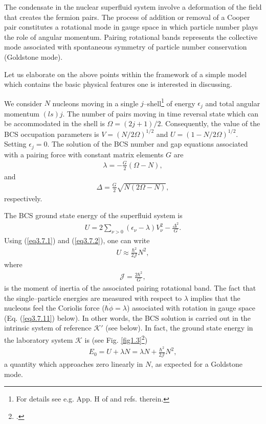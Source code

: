 The condensate in the nuclear superfluid system involve a deformation of the field that creates the fermion pairs. The process of addition or removal of a Cooper pair constitutes a rotational mode in gauge space in which particle number plays the role of angular momentum. Pairing rotational bands represents the collective mode associated with spontaneous symmetry of particle number conservation (Goldstone mode).


Let us elaborate on the above points within the framework of a simple model which contains the basic physical features one is interested in discussing.


We consider $N$ nucleons moving in a single $j$--shell\footnote{For details see e.g. App. H of \cite{Brink:05} and refs. therein.} of energy $\epsilon_j$ and total angular momentum $(ls)j$. The number of pairs moving in time reversal state which can be accommodated in the shell is $\Omega=(2j+1)/2$. Consequently, the value of the BCS occupation parameters is $V=(N/2\Omega)^{1/2}$ and $U=(1-N/2\Omega)^{1/2}$. Setting $\epsilon_j=0$. The solution of the BCS number and gap equations associated with a pairing force with constant matrix elements $G$ are
  \begin{align}\label{eq3.7.1}
  \lambda=-\frac{G}{2}(\Omega-N),
  \end{align}
  and
  \begin{align}\label{eq3.7.2}
\Delta=\frac{G}{2}\sqrt{N(2\Omega-N)},
  \end{align}
respectively.


The BCS ground state energy of the superfluid system is
  \begin{align}\label{eq3.7.3}
U=2\sum_{\nu>0}(\epsilon_\nu-\lambda)V^2_\nu-\frac{\Delta^2}{G}.
  \end{align}
Using (\ref{eq3.7.1}) and (\ref{eq3.7.2}), one can write
  \begin{align}\label{eq3.7.4}
U\approx\frac{\hbar^2}{2\mathcal J}N^2,  
    \end{align}
where
  \begin{align}\label{eq3.7.5}
\mathcal J=\frac{2\hbar^2}{G},  
    \end{align}
is the moment of inertia of the associated pairing rotational band. The fact that the single--particle energies are measured with respect to $\lambda$ implies that the nucleons feel the Coriolis force ($\hbar\dot{\phi}=\lambda$) associated with rotation in gauge space (Eq. (\ref{eq3.7.11}) below). In other words, the BCS solution is carried out in the intrinsic system of reference $\mathcal K'$ (see below). In fact, the ground state energy in the laboratory system $\mathcal K$ is (see Fig. \ref{fig1.3}\footnote{\cite{Broglia:00}.})
  \begin{align}\label{eq3.7.6}
E_0=U+\lambda N=\lambda N+\frac{\hbar^2}{2\mathcal J}N^2,  
    \end{align}
a quantity which approaches zero linearly in $N$, as expected for a Goldstone mode.















